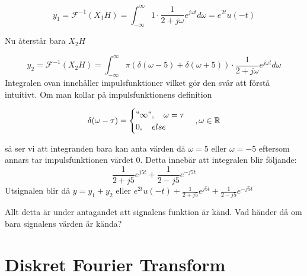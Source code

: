 \documentclass{article}
\begin{document}
\begin{displaymath}
  y_1 = \mathcal{F}^{-1}(X_1 H)
  = \int_{-\infty}^{\infty} 1 \cdot \frac{1}{2+j \omega} e^{j \omega t} d\omega
  = e^{2 t} u(-t)
\end{displaymath}

Nu återstår bara $X_2 H$

\begin{displaymath}
  y_2=\mathcal{F}^{-1}(X_2 H) = \int_{-\infty}^{\infty} \pi(\delta(\omega - 5)
  + \delta(\omega + 5)) \cdot \frac{1}{2+j \omega} e^{j \omega t} d\omega
\end{displaymath}
Integralen ovan innehåller impulsfunktioner vilket gör den svår att förstå
intuitivt. Om man kollar på impulsfunktionens definition

\begin{displaymath}
\delta(\omega - \tau)=
\begin{cases}
"\infty",\quad \omega = \tau \\
0, \quad else
\end{cases}, \omega \in \mathbb{R}
\end{displaymath}

så ser vi att integranden bara kan anta värden då $\omega=5$ eller $\omega =-5$
eftersom annars tar impulsfunktionen värdet 0.
Detta innebär att integralen blir följande:
\begin{displaymath}
  \frac{1}{2+j 5} e^{j 5 t} + \frac{1}{2-j 5} e^{-j 5 t}
\end{displaymath}
Utsignalen blir då $y=y_1 + y_2$ eller
$e^{2 t} u(-t) + \frac{1}{2+j 5} e^{j 5 t} + \frac{1}{2-j 5} e^{-j 5 t}$

Allt detta är under antagandet att signalens funktion är känd.
Vad händer då om bara signalens värden är kända?

\section{Diskret Fourier Transform}
\end{document}
